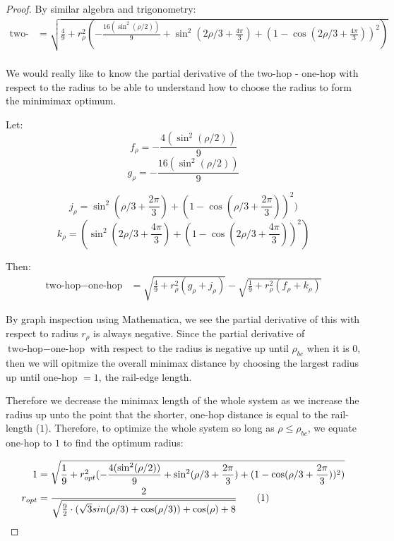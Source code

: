 \documentclass[11pt]{article}
\newcommand\numberthis{\addtocounter{equation}{1}\tag{\theequation}}
\begin{document}
\begin{proof}
By similar algebra and trigonometry:
\begin{align*}
  \text{two-hop}  &= \sqrt{\frac{4}{9} + r_{\rho}^2 (-\frac{16 (\sin^2( \rho / 2))}{9} + \sin^2(2\rho/3 + \frac{4\pi}{3})  + (1 - \cos(2\rho/3 + \frac{4\pi}{3}))^2)} \\
\end{align*}

We would really like to know the partial derivative of the two-hop - one-hop with respect
to the radius to be able to understand how to choose the radius to form the minimimax optimum.

Let:
\begin{equation}
  f_{\rho} = -\frac{4 (\sin^2( \rho / 2))}{9}
  \end{equation}
\begin{equation}
  g_{\rho} = -\frac{16 (\sin^2( \rho / 2))}{9} 
\end{equation}

\begin{equation}
  j_{\rho} = \sin^2(\rho/3+ \frac{2\pi}{3})  + (1 - \cos(\rho/3 + \frac{2\pi}{3}))^2)
\end{equation}
\begin{equation}
  k_{\rho} = (\sin^2(2\rho/3 + \frac{4\pi}{3})  + (1 - \cos(2\rho/3 + \frac{4\pi}{3}))^2)
\end{equation}

Then:
\begin{align*}
  \text{two-hop} - \text{one-hop}  &= \sqrt{\frac{4}{9}  + r_{\rho}^2(g_{\rho}+ j_{\rho})}
  - \sqrt{\frac{1}{9} +r_{\rho}^2(f_{\rho}+k_{\rho}) }
\end{align*}



By graph inspection using Mathematica, we see the partial derivative of this with respect to
radius $r_{\rho}$ is always negative.
Since the partial derivative of $\text{two-hop} - \text{one-hop}$ with respect to the
radius is negative up until $\rho_{bc}$ when it is $0$, then
we will opitmize the overall minimax distance by choosing the largest radius
up until one-hop $= 1$, the rail-edge length.


Therefore we decrease the minimax length
of the whole system as we increase the radius
up unto the point that the shorter, one-hop distance is equal to the rail-length ($1$).
Therefore, to optimize the whole system so long as $\rho \leq \rho_{bc}$,
we equate one-hop to $1$ to find the optimum radius:


\begin{align*}
  1 &=  \sqrt{\frac{1}{9}  + r_{opt}^2(-\frac{4 (\sin^2( \rho / 2))}{9} + \sin^2(\rho/3+ \frac{2\pi}{3})  + (1 - \cos(\rho/3 + \frac{2\pi}{3}))^2)} \\
  r_{opt} &= \frac{2}{\sqrt{\frac{9}{2} \cdot ( \sqrt{3} sin(\rho/3) + \cos(\rho/3)) + \cos(\rho)+ 8 }} \numberthis  \label{eqrhoopt} \\
\end{align*}


\end{proof}
\end{document}
